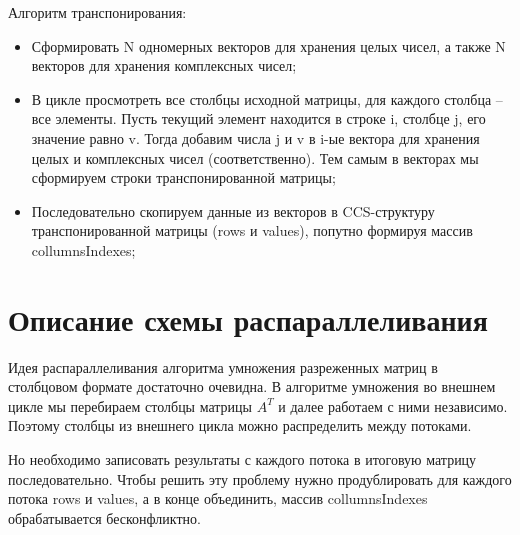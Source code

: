 \documentclass{report}
\begin{document}
\par Алгоритм транспонирования:
\begin{itemize}
	\item Сформировать N одномерных векторов для хранения целых чисел, а также N векторов для хранения комплексных чисел;
	\item В цикле просмотреть все столбцы исходной матрицы, для каждого столбца – все элементы. Пусть текущий элемент находится в строке i, столбце j, его значение равно v. Тогда добавим числа j и v в i-ые вектора для хранения целых и комплексных чисел (соответственно). Тем самым в векторах мы сформируем строки транспонированной матрицы;
	\item Последовательно скопируем данные из векторов в CCS-структуру транспонированной матрицы (rows и values), попутно формируя массив collumnsIndexes;
\end{itemize}
\newpage

\section*{Описание схемы распараллеливания}
\par Идея распараллеливания алгоритма умножения разреженных матриц в столбцовом формате достаточно очевидна. В алгоритме умножения во внешнем цикле мы перебираем столбцы матрицы $A^{T}$ и далее работаем с ними независимо. Поэтому столбцы из внешнего цикла можно распределить между потоками.
\par Но необходимо записовать результаты с каждого потока в итоговую матрицу последовательно. Чтобы решить эту проблему нужно продублировать для каждого потока rows и values, а в конце объединить, массив collumnsIndexes обрабатывается бесконфликтно.
\newpage
\end{document}
